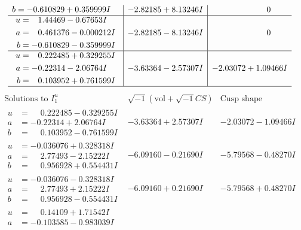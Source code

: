 \documentclass[1p]{elsarticle_modified}
\theoremstyle{definition}
\newcommand{\I}{\sqrt{-1}}
\begin{document}
$$\begin{array}{c|c|c}
\begin{aligned}
b &= -0.610829 + 0.359999 I\end{aligned}
 & -2.82185 + 8.13246 I & \phantom{-0.000000 } 0 \\ \hline\begin{aligned}
u &= \phantom{-}1.44469 - 0.67653 I \\
a &= \phantom{-}0.461376 - 0.000212 I \\
b &= -0.610829 - 0.359999 I\end{aligned}
 & -2.82185 - 8.13246 I & \phantom{-0.000000 } 0 \\ \hline\begin{aligned}
u &= \phantom{-}0.222485 + 0.329255 I \\
a &= -0.22314 - 2.06764 I \\
b &= \phantom{-}0.103952 + 0.761599 I\end{aligned}
 & -3.63364 - 2.57307 I & -2.03072 + 1.09466 I\\
 \hline 
 \end{array}$$\newpage$$\begin{array}{c|c|c}  
\text{Solutions to }I^u_{1}& \I (\text{vol} + \sqrt{-1}CS) & \text{Cusp shape}\\
 \hline 
\begin{aligned}
u &= \phantom{-}0.222485 - 0.329255 I \\
a &= -0.22314 + 2.06764 I \\
b &= \phantom{-}0.103952 - 0.761599 I\end{aligned}
 & -3.63364 + 2.57307 I & -2.03072 - 1.09466 I \\ \hline\begin{aligned}
u &= -0.036076 + 0.328318 I \\
a &= \phantom{-}2.77493 - 2.15222 I \\
b &= \phantom{-}0.956928 + 0.554431 I\end{aligned}
 & -6.09160 - 0.21690 I & -5.79568 - 0.48270 I \\ \hline\begin{aligned}
u &= -0.036076 - 0.328318 I \\
a &= \phantom{-}2.77493 + 2.15222 I \\
b &= \phantom{-}0.956928 - 0.554431 I\end{aligned}
 & -6.09160 + 0.21690 I & -5.79568 + 0.48270 I \\ \hline\begin{aligned}
u &= \phantom{-}0.14109 + 1.71542 I \\
a &= -0.103585 - 0.983039 I \\

\end{aligned}
\end{array}$$
\end{document}
